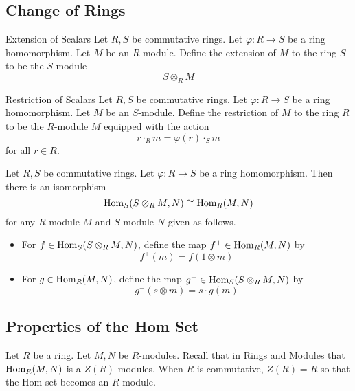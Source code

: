 \documentclass[a4paper]{article}
\begin{document}
\subsection{Change of Rings}
\begin{defn}{Extension of Scalars}{} Let $R,S$ be commutative rings. Let $\varphi:R\to S$ be a ring homomorphism. Let $M$ be an $R$-module. Define the extension of $M$ to the ring $S$ to be the $S$-module $$S\otimes_R M$$
\end{defn}

\begin{defn}{Restriction of Scalars}{} Let $R,S$ be commutative rings. Let $\varphi:R\to S$ be a ring homomorphism. Let $M$ be an $S$-module. Define the restriction of $M$ to the ring $R$ to be the $R$-module $M$ equipped with the action $$r\cdot_R m=\varphi(r)\cdot_S m$$ for all $r\in R$. 
\end{defn}

\begin{thm}{}{} Let $R,S$ be commutative rings. Let $\varphi:R\to S$ be a ring homomorphism. Then there is an isomorphism $$\operatorname{Hom}_S(S\otimes_R M,N)\cong\operatorname{Hom}_R(M,N)$$ for any $R$-module $M$ and $S$-module $N$ given as follows. 
\begin{itemize}
\item For $f\in\operatorname{Hom}_S(S\otimes_R M,N)$, define the map $f^+\in\operatorname{Hom}_R(M,N)$ by $$f^+(m)=f(1\otimes m)$$
\item For $g\in\operatorname{Hom}_R(M,N)$, define the map $g^-\in\operatorname{Hom}_S(S\otimes_RM,N)$ by $$g^-(s\otimes m)=s\cdot g(m)$$
\end{itemize}
\end{thm}

\subsection{Properties of the Hom Set}
Let $R$ be a ring. Let $M,N$ be $R$-modules. Recall that in Rings and Modules that $\operatorname{Hom}_R(M,N)$ is a $Z(R)$-modules. When $R$ is commutative, $Z(R)=R$ so that the Hom set becomes an $R$-module. 
\end{document}
